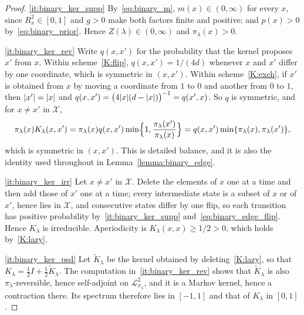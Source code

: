 \documentclass[aos]{imsart}%
\DeclarePairedDelimiter{\abs}{\lvert}{\rvert}
\newcommand{\ambientspace}[0]{\mathcal{X}}
\newcommand{\calL}[0]{\mathcal{L}}
\theoremstyle{plain}
\theoremstyle{definition}
\begin{document}
    \begin{proof}
        \ref{it:binary_ker_supp} By~\eqref{eq:binary_m}, $m(x)\in(0,\infty)$
        for every $x$, since $R^{2}_x\in[0,1]$ and $g>0$ make both factors
        finite and positive; and $p(x)>0$ by~\eqref{eq:binary_prior}. Hence
        $Z(\lambda)\in(0,\infty)$ and $\pi_\lambda(x)>0$.

        \ref{it:binary_ker_rev} Write $q(x,x')$ for the probability that the
        kernel proposes $x'$ from $x$. Within scheme~\ref{K:flip},
        $q(x,x')=1/(4d)$ whenever $x$ and $x'$ differ by one coordinate, which
        is symmetric in $(x,x')$. Within scheme~\ref{K:exch}, if $x'$ is
        obtained from $x$ by moving a coordinate from $1$ to $0$ and another
        from $0$ to $1$, then $\abs{x'}=\abs{x}$ and
        $q(x,x')=\bigl(4\abs x(d-\abs x)\bigr)^{-1}=q(x',x)$. So $q$ is
        symmetric, and for $x\neq x'$ in $\ambientspace$,
        \begin{equation*}
            \pi_\lambda(x)K_\lambda(x,x')
            =\pi_\lambda(x)q(x,x')
            \min\Bigl\{1,\frac{\pi_\lambda(x')}{\pi_\lambda(x)}\Bigr\}
            =q(x,x')\min\{\pi_\lambda(x),\pi_\lambda(x')\},
        \end{equation*}
        which is symmetric in $(x,x')$. This is detailed balance, and it is
        also the identity used throughout in Lemma~\ref{lemma:binary_edge}.

        \ref{it:binary_ker_irr} Let $x\neq x'$ in $\ambientspace$. Delete the
        elements of $x$ one at a time and then add those of $x'$ one at a
        time; every intermediate state is a subset of $x$ or of $x'$, hence
        lies in $\ambientspace$, and consecutive states differ by one flip, so
        each transition has positive probability by~\ref{it:binary_ker_supp}
        and~\eqref{eq:binary_edge_flip}. Hence $K_\lambda$ is irreducible.
        Aperiodicity is $K_\lambda(x,x)\geq1/2>0$, which holds
        by~\ref{K:lazy}.

        \ref{it:binary_ker_psd} Let $\widetilde K_\lambda$ be the kernel
        obtained by deleting~\ref{K:lazy}, so that
        $K_\lambda=\tfrac12I+\tfrac12\widetilde K_\lambda$. The computation
        in~\ref{it:binary_ker_rev} shows that $\widetilde K_\lambda$ is also
        $\pi_\lambda$-reversible, hence self-adjoint on
        $\calL^{2}_{\pi_\lambda}$, and it is a Markov kernel, hence a
        contraction there. Its spectrum therefore lies in $[-1,1]$ and that of
        $K_\lambda$ in $[0,1]$.
    \end{proof}
\end{document}
